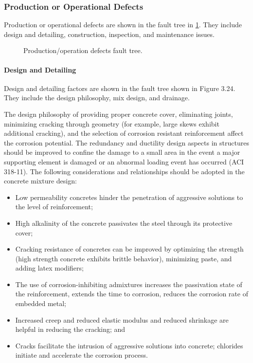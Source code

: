\subsubsection{Production or Operational Defects}
Production or operational defects are shown in the fault tree in \cref{fig:fault-tree-production-operation}. They include design and detailing, construction, inspection, and maintenance issues.

\begin{figure}
  \caption{Production/operation defects fault tree.}\label{fig:fault-tree-production-operation}
\end{figure}

\paragraph{Design and Detailing}
Design and detailing factors are shown in the fault tree shown in Figure 3.24. They include the design philosophy, mix design, and drainage.

The design philosophy of providing proper concrete cover, eliminating joints, minimizing cracking through geometry (for example, large skews exhibit additional cracking), and the selection of corrosion resistant reinforcement affect the corrosion potential. The redundancy and ductility design aspects in structures should be improved to confine the damage to a small area in the event a major supporting element is damaged or an abnormal loading event has occurred (ACI 318-11). The following considerations and relationships should be adopted in the concrete mixture design:

\begin{itemize}
  \item Low permeability concretes hinder the penetration of aggressive solutions to the level of reinforcement;
  \item High alkalinity of the concrete passivates the steel through its protective cover;
  \item Cracking resistance of concretes can be improved by optimizing the strength (high strength concrete exhibits brittle behavior), minimizing paste, and adding latex modifiers;
  \item The use of corrosion-inhibiting admixtures increases the passivation state of the reinforcement, extends the time to corrosion, reduces the corrosion rate of embedded metal;
  \item Increased creep and reduced elastic modulus and reduced shrinkage are helpful in reducing the cracking; and
  \item Cracks facilitate the intrusion of aggressive solutions into concrete; chlorides initiate and accelerate the corrosion process.
\end{itemize}
